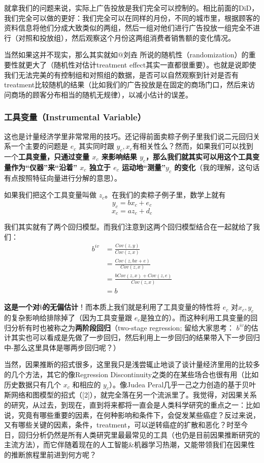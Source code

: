 \documentclass[12pt]{article}
\begin{document}
就拿我们的问题来说，实际上广告投放是我们完全可以控制的。相比前面的DiD，我们完全可以做的更好：我们完全可以在同样的月份，不同的城市里，根据顾客的资料信息将他们分成大致类似的两组，然后一组对他们进行广告投放一组完全不进行（对照和投放组），然后观察这个月份这两组消费者销售额的变化情况。

当然如果这并不现实，那么其实就如@刘垚 所说的随机性（randomization）的重要性就更大了（随机性对估计treatment effect其实一直都很重要）。也就是说即使我们无法完美的有控制组和对照组的数据，是否可以自然观察到针对是否有treatment比较随机的结果（比如我们的广告投放是在固定的商场门口，然后来访问商场的顾客分布相当的随机无规律），以减小估计的误差。

\subsubsection{工具变量（Instrumental Variable）}
这也是计量经济学里非常常用的技巧。还记得前面卖粽子例子里我们说二元回归关系一个主要的问题是 $e_c$ 其实同时跟 $y_c, x_c$有相关性么？然而，如果我们可以找到一个\textbf{工具变量，只通过变量 $x_c$ 来影响结果 $y_c$，那么我们就其实可以用这个工具变量作为“仪器”来“沿着” $x_c$ 独立于 $e_c$ 运动地“测量”$y_c$ 的变化}（我的理解，这句话有点按照特征向量进行分解的意思）。

如果我们把这个工具变量叫做 $z_c$。在我们的卖粽子例子里，数学上就有
$$
y_c = bx_c + e_c
$$
$$
x_c = az_c + d_c
$$

我们其实就有了两个回归模型。而我们注意到这两个回归模型结合在一起就给了我们：
\begin{align*}
b^{iv} &= \frac{Cov(z,y)}{Cov(z,x)} \\
         &= \frac{Cov(z,bx+e)}{Cov(z,x)} \\
         &= \frac{bCov(z,x) + Cov(z,e)}{Cov(z,x)}\\
         & = b
\end{align*}

\textbf{这是一个对$b$的无偏估计}！而本质上我们就是利用了工具变量的特性将 $e_c$ 对$x_c, y_c$的复杂影响给排除掉了（因为工具变量跟 $e_c$是独立的）。而这种利用工具变量的回归分析有时也被称之为\textbf{两阶段回归}（two-stage regression; 留给大家思考： $b^{iv}$的估计其实也可以看成是先做了一步回归，然后利用上一步回归的结果带入下一步回归中-那么这里具体是哪两步回归呢？）

当然，因果推断的招式很多，这里我只是浅尝辄止地谈了谈计量经济里用的比较多的几个方法，其它的像Regression Discontinuity之类的在某些场合也很有用（比如历史数据只有几个 $x_c$ 和相应的 $y_c$）。像Judea Peral几乎一己之力创造的基于贝叶斯网络和图模型的招式（[2]），就完全落在另一个流派里了。我觉得，对因果关系的研究，从过去，到现在，直到将来都将一直会是人类科学研究的重点之一：比如说，究竟有哪些重要的因素，在何种影响和条件下，会促发某些癌症？反过来说，又有哪些关键的因素，条件，treatment，可以逆转癌症的扩散和恶化？时至今日，回归分析仍然是所有人类研究里最最常见的工具（也仍是目前因果推断研究的主流方法），而它伴随着现在的人工智能\&机器学习热潮，又能带领我们在因果性的推断旅程里前进到何方呢？








\end{document}
